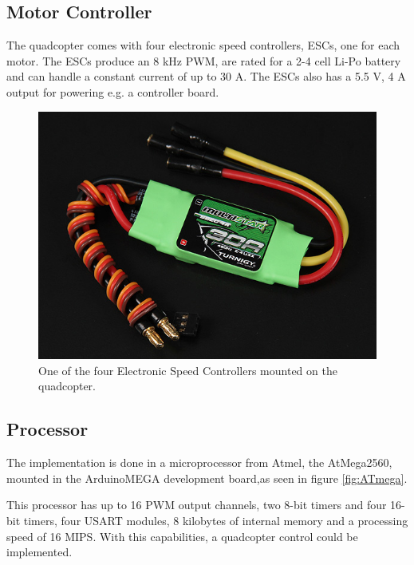  
\subsection{Motor Controller}
The quadcopter comes with four electronic speed controllers, ESCs, one for each motor. The ESCs produce an 8 kHz PWM, are rated for a 2-4 cell Li-Po battery and can handle a constant current of up to 30 A. The ESCs also has a 5.5 V, 4 A output for powering e.g. a controller board.\cite{HKing}

\begin{figure}[H]
	\centering
	\includegraphics[scale=0.4]{figures/ESC}
	\caption{One of the four Electronic Speed Controllers mounted on the quadcopter.\cite{HKing}}
	\label{fig:esc}
\end{figure}
\subsection{Processor}
The implementation is done in a microprocessor from Atmel, the AtMega2560, mounted in the ArduinoMEGA development board,as seen in figure \autoref{fig:ATmega}.

This processor has up to 16 PWM output channels, two 8-bit timers and four 16-bit timers, four USART modules, 8 kilobytes of internal memory and a processing speed of 16 MIPS. With this capabilities, a quadcopter control could be implemented.

